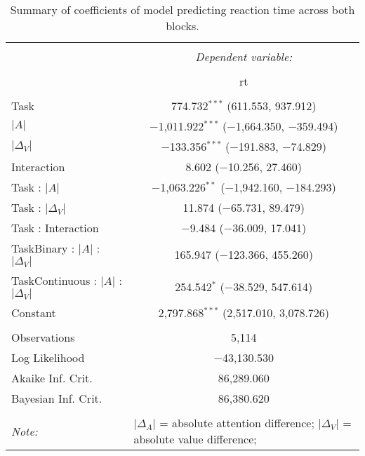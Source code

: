 
\begin{table}[t] \centering 
  \caption{Summary of coefficients of model predicting reaction time across both blocks.} 
  \label{table:rtModel} 
\begin{tabular}{@{\extracolsep{5pt}}lc} 
\\[-1.8ex]\hline 
\hline \\[-1.8ex] 
 & \multicolumn{1}{c}{\textit{Dependent variable:}} \\ 
\cline{2-2} 
\\[-1.8ex] & rt \\ 
\hline \\[-1.8ex] 
 Task & 774.732$^{***}$ (611.553, 937.912) \\ 
  $\vert A \vert$ & $-$1,011.922$^{***}$ ($-$1,664.350, $-$359.494) \\ 
  $\vert\Delta_V\vert$ & $-$133.356$^{***}$ ($-$191.883, $-$74.829) \\ 
  Interaction & 8.602 ($-$10.256, 27.460) \\ 
  Task : $\vert A \vert$ & $-$1,063.226$^{**}$ ($-$1,942.160, $-$184.293) \\ 
  Task : $\vert\Delta_V\vert$ & 11.874 ($-$65.731, 89.479) \\ 
  Task : Interaction & $-$9.484 ($-$36.009, 17.041) \\ 
  TaskBinary : $\vert A \vert$ :  $\vert\Delta_V\vert$ & 165.947 ($-$123.366, 455.260) \\ 
  TaskContinuous : $\vert A \vert$ :  $\vert\Delta_V\vert$ & 254.542$^{*}$ ($-$38.529, 547.614) \\ 
  Constant & 2,797.868$^{***}$ (2,517.010, 3,078.726) \\ 
 \hline \\[-1.8ex] 
Observations & 5,114 \\ 
Log Likelihood & $-$43,130.530 \\ 
Akaike Inf. Crit. & 86,289.060 \\ 
Bayesian Inf. Crit. & 86,380.620 \\ 
\hline 
\hline \\[-1.8ex] 
\textit{Note:}  & \multicolumn{1}{l}{\footnotesize $\vert\Delta_A\vert$ = absolute attention difference; $\vert\Delta_V\vert$ = absolute value difference; } \\ 
\end{tabular} 
\end{table} 

